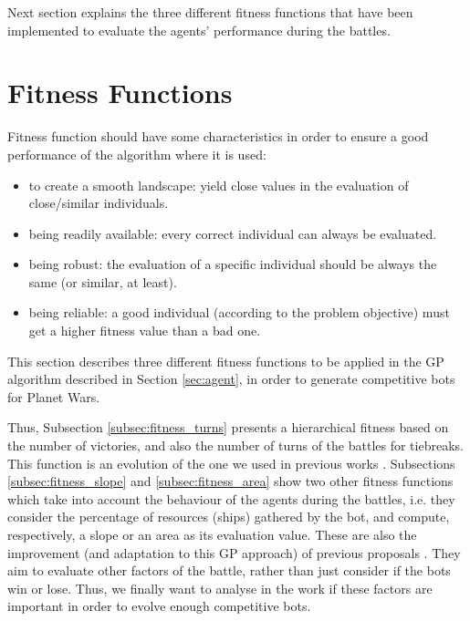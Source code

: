 \documentclass[preprint]{elsarticle}
\begin{document}
Next section explains the three different fitness functions that have been implemented to evaluate the agents' performance during the battles. 



\section{Fitness Functions}
\label{sec:fitness_functions}


Fitness function should have some characteristics in order to ensure a good performance of the algorithm where it is used: 
\begin{itemize}
\item to create a smooth landscape: yield close values in the evaluation of close/similar individuals.
\item being readily available: every correct individual can always be evaluated.
\item being robust: the evaluation of a specific individual should be always the same (or similar, at least).
\item being reliable: a good individual (according to the problem objective) must get a higher fitness value than a bad one.
\end{itemize}

This section describes three different fitness functions to be applied in the GP algorithm described in Section \ref{sec:agent}, in order to generate competitive bots for Planet Wars.

Thus, Subsection \ref{subsec:fitness_turns} presents a hierarchical fitness based on the number of victories, and also the number of turns of the battles for tiebreaks. This function is an evolution of the one we used in previous works \cite{Genebot_CEC11,genebot-evo12,Garcia14Treedepth}.
Subsections \ref{subsec:fitness_slope} and \ref{subsec:fitness_area} show two other fitness functions which take into account the behaviour of the agents during the battles, i.e. they consider the percentage of resources (ships) gathered by the bot, and compute, respectively, a slope or an area as its evaluation value. These are also the improvement (and adaptation to this GP approach) of previous proposals \cite{Co-Genebot_EVO2014}. They aim to evaluate other factors of the battle, rather than just consider if the bots win or lose. 
Thus, we finally want to analyse in the work if these factors are important in order to evolve enough competitive bots.
\end{document}
